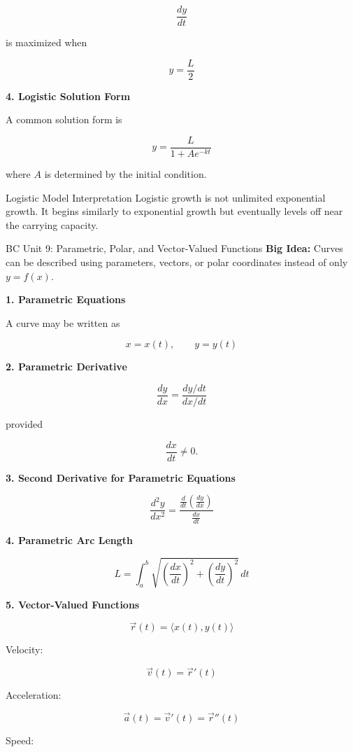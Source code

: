 \documentclass[11pt]{article}
\newcommand{\subtopic}[1]{
\vspace{0.45em}
\textcolor{novelPurpleDark}{\textbf{#1}}
}
\begin{document}
\[
\frac{dy}{dt}
\]

is maximized when

\[
y=\frac{L}{2}
\]

\subtopic{4. Logistic Solution Form}

A common solution form is

\[
y=\frac{L}{1+Ae^{-kt}}
\]

where \(A\) is determined by the initial condition.

\begin{warningbox}{Logistic Model Interpretation}
Logistic growth is not unlimited exponential growth.  
It begins similarly to exponential growth but eventually levels off near the carrying capacity.
\end{warningbox}

\newpage

\begin{unitbox}{BC Unit 9: Parametric, Polar, and Vector-Valued Functions}
\textbf{Big Idea:} Curves can be described using parameters, vectors, or polar coordinates instead of only \(y=f(x)\).
\end{unitbox}

\subtopic{1. Parametric Equations}

A curve may be written as

\[
x=x(t),\qquad y=y(t)
\]

\subtopic{2. Parametric Derivative}

\[
\frac{dy}{dx}=\frac{dy/dt}{dx/dt}
\]

provided

\[
\frac{dx}{dt}\neq0.
\]

\subtopic{3. Second Derivative for Parametric Equations}

\[
\frac{d^2y}{dx^2}
=
\frac{\frac{d}{dt}\left(\frac{dy}{dx}\right)}{\frac{dx}{dt}}
\]

\subtopic{4. Parametric Arc Length}

\[
L=\int_a^b \sqrt{\left(\frac{dx}{dt}\right)^2+\left(\frac{dy}{dt}\right)^2}\,dt
\]

\subtopic{5. Vector-Valued Functions}

\[
\vec r(t)=\langle x(t),y(t)\rangle
\]

Velocity:

\[
\vec v(t)=\vec r'(t)
\]

Acceleration:

\[
\vec a(t)=\vec v'(t)=\vec r''(t)
\]

Speed:
\end{document}
